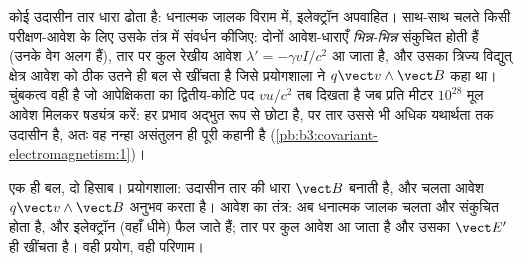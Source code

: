 \begin{example}[उदासीन तार से चुंबकत्व]\label{ex:b3:covariant-electromagnetism:wire}
कोई उदासीन तार धारा ढोता है: धनात्मक जालक विराम में, इलेक्ट्रॉन
अपवाहित। साथ-साथ चलते किसी परीक्षण-आवेश के लिए उसके तंत्र में संवर्धन
कीजिए: दोनों आवेश-धाराएँ \emph{भिन्न-भिन्न} संकुचित होती हैं (उनके वेग
अलग हैं), तार पर कुल रेखीय आवेश $\lambda' =
-\gamma vI/c^2$ आ जाता है, और उसका त्रिज्य विद्युत् क्षेत्र आवेश को
ठीक उतने ही बल से खींचता है जिसे प्रयोगशाला ने $q\vect v\wedge\vect B$
कहा था। चुंबकत्व वही है जो आपेक्षिकता का द्वितीय-कोटि पद $v u/c^2$ तब
दिखता है जब प्रति मीटर
$10^{28}$ मूल आवेश मिलकर षड्यंत्र करें: हर प्रभाव अद्भुत रूप से छोटा
है, पर तार उससे भी अधिक यथार्थता तक उदासीन है, अतः वह नन्हा असंतुलन ही
पूरी कहानी है (\cref{pb:b3:covariant-electromagnetism:1})।
\end{example}

\begin{omfigure}

{\small एक ही बल, दो हिसाब। प्रयोगशाला: उदासीन तार की धारा
$\vect B$ बनाती है, और चलता आवेश $q\vect v\wedge\vect B$ अनुभव करता है।
आवेश का तंत्र: अब धनात्मक जालक चलता और संकुचित होता है, और
इलेक्ट्रॉन (वहाँ धीमे) फैल जाते हैं; तार पर कुल आवेश आ जाता है और उसका
$\vect E'$ ही खींचता है। वही प्रयोग, वही परिणाम।}
\end{omfigure}

